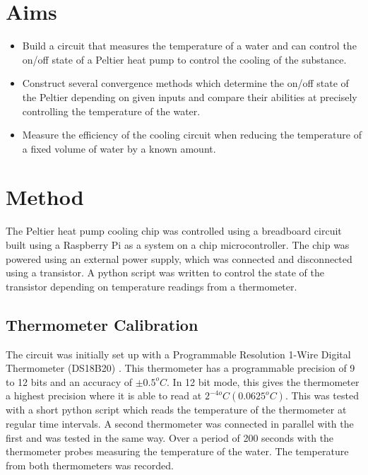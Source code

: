 \documentclass[10pt]{article}
\begin{document}


\section*{Aims}
\begin{itemize}
    \item Build a circuit that measures the temperature of a water and can control the on/off state of a Peltier heat pump \cite{peltier}\cite{pelt} to control the cooling of the substance. 
    \item Construct several convergence methods which determine the on/off state of the Peltier depending on given inputs and compare their abilities at precisely controlling the temperature of the water.
    \item Measure the efficiency of the cooling circuit when reducing the temperature of a fixed volume of water by a known amount.
\end{itemize}
\section*{Method}
The Peltier heat pump cooling chip was controlled using a breadboard circuit built using a Raspberry Pi \cite{rpi} as a system on a chip microcontroller. The chip was powered using an external power supply, which was connected and disconnected using a transistor. A python script was written to control the state of the transistor depending on temperature readings from a thermometer. 

\subsection*{Thermometer Calibration}
The circuit was initially set up with a Programmable Resolution 1-Wire Digital Thermometer (DS18B20) \cite{thermometer}. This thermometer has a programmable precision of 9 to 12 bits and an accuracy of $\pm 0.5^oC$. In 12 bit mode, this gives the thermometer a highest precision where it is able to read at $2^{-4o} C (0.0625^o C)$. This was tested with a short python script which reads the temperature of the thermometer at regular time intervals. A second thermometer was connected in parallel with the first and was tested in the same way. Over a period of 200 seconds with the thermometer probes measuring the temperature of the water. The temperature from both thermometers was recorded.
\end{document}
